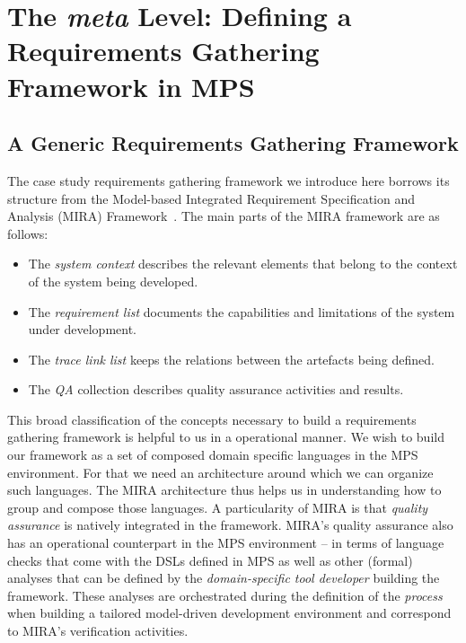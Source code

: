 \section{The \emph{meta} Level: Defining a Requirements Gathering Framework in
MPS}
\label{sec:meta}
\vspace{-.3cm}
\subsection{A Generic Requirements Gathering Framework}
\label{sec:generic_req_fram}
\vspace{-.3cm}
The case study requirements gathering framework we introduce here borrows its
structure from the Model-based Integrated Requirement Specification and Analysis (MIRA)
Framework~\cite{MIRA13,AF315}. The main parts of the MIRA framework are
as follows:
\vspace{-.1cm}
\begin{itemize}
  \item The \emph{system context} describes the relevant elements that belong
  to the context of the system being developed.
  \item The \emph{requirement list} documents the capabilities and limitations
  of the system under development.
  \item The \emph{trace link list} keeps the relations between the artefacts
  being defined.
  \item The \emph{QA} collection describes quality assurance activities and
  results.
\end{itemize}
\vspace{-.1cm}
This broad classification of the concepts necessary to build a requirements
gathering framework is helpful to us in a operational manner. We wish to build
our framework as a set of composed domain specific languages in the MPS
environment. For that we need an architecture around which we can organize such
languages. The MIRA architecture thus helps us in understanding how to group and
compose those languages. A particularity of MIRA is that \emph{quality
assurance} is natively integrated in the framework. MIRA's quality assurance
also has an operational counterpart in the MPS environment -- in terms of
language checks that come with the DSLs defined in MPS as well as other (formal)
analyses that can be defined by the \emph{domain-specific tool developer}
building the framework. These analyses are orchestrated during the definition of
the \emph{process} when building a tailored model-driven development environment
and correspond to MIRA's verification activities.\vspace{-.7cm}
